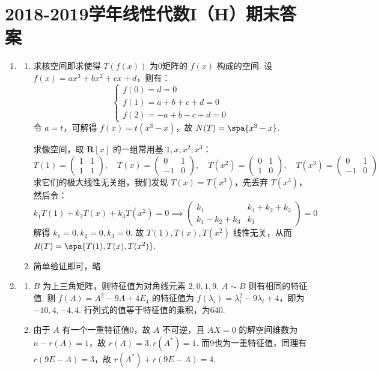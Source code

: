 \section{2018-2019学年线性代数I（H）期末答案}

\begin{enumerate}
    \item \begin{enumerate}
        \item 求核空间即求使得 $T(f(x))$ 为0矩阵的 $f(x)$ 构成的空间. 设 $f(x)=ax^{3}+bx^{2}+cx+d$，则有：
        $$
        \begin{cases}
        f(0)=d=0\\
        f(1)=a+b+c+d=0\\
        f(2)=-a+b-c+d=0
        \end{cases}
        $$
        令 $a=t$，可解得 $f(x)=t(x^{3}-x)$，故 $N(T)=\spa\{x^{3}-x\}$.

        求像空间，取 $\mathbf{R}[x]$ 的一组常用基 $1,x,x^{2},x^{3}$：
        $$
        T(1)=\begin{pmatrix}1&1\\ 1&1\end{pmatrix}, \quad T(x)=\begin{pmatrix}0&1\\ -1&0\end{pmatrix}, \quad T(x^{2})=\begin{pmatrix}0&1\\ 1&0\end{pmatrix}, \quad T(x^{3})=\begin{pmatrix}0&1\\ -1&0\end{pmatrix}
        $$
        求它们的极大线性无关组，我们发现 $T(x)=T(x^{3})$，先丢弃 $T(x^{3})$，然后令：
        $$
        k_{1}T(1)+k_{2}T(x)+k_{3}T(x^{2})=0 \implies \begin{pmatrix}k_{1}&k_{1}+k_{2}+k_{3}\\ k_{1}-k_{2}+k_{3}&k_{1}\end{pmatrix}=0
        $$
        解得 $k_1=0, k_2=0, k_3=0$. 故 $T(1),T(x),T(x^{2})$ 线性无关，从而 $R(T)=\spa\{T(1),T(x),T(x^{2})\}$.

        \item 简单验证即可，略.
    \end{enumerate}

    \item \begin{enumerate}
        \item $B$ 为上三角矩阵，则特征值为对角线元素 $2,0,1,9$. $A \sim B$ 则有相同的特征值. 则 $f(A)=A^{2}-9A+4E_{4}$ 的特征值为 $f(\lambda_{i})=\lambda_i^2 - 9\lambda_i + 4$，即为 $-10, 4, -4, 4$. 行列式的值等于特征值的乘积，为640.
        \item 由于 $A$ 有一个一重特征值0，故 $A$ 不可逆，且 $AX=0$ 的解空间维数为 $n-r(A)=1$，故 $r(A)=3, r(A^{*})=1$. 而9也为一重特征值，同理有 $r(9E-A)=3$，故 $r(A^{*})+r(9E-A)=4$.
    \end{enumerate}


\end{enumerate}
